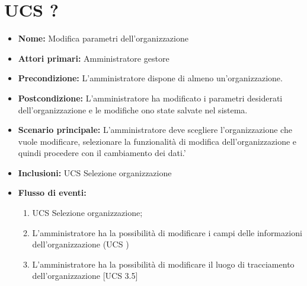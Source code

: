 

\section{UCS ?}%
\begin{itemize}
    \item \textbf{Nome:} Modifica parametri dell'organizzazione\\
    \item \textbf{Attori primari:} Amministratore gestore\\
    \item \textbf{Precondizione:} L’amministratore dispone di almeno un'organizzazione.\\
    \item \textbf{Postcondizione:} L’amministratore ha modificato i parametri desiderati dell'organizzazione e le modifiche ono state salvate nel sistema.\\
    \item \textbf{Scenario principale:} L'amministratore deve scegliere l'organizzazione che vuole modificare, selezionare la funzionalità di modifica dell'organizzazione e quindi procedere con il cambiamento dei dati.'\\
    \item \textbf{Inclusioni:} UCS Selezione organizzazione
    \item \textbf{Flusso di eventi:}
    \begin{enumerate}
        \item UCS Selezione organizzazione;
        \item L'amministratore ha la possibilità di modificare i campi delle informazioni dell’organizzazione (UCS )
        \item L’amministratore ha la possibilità di modificare il luogo di tracciamento dell’organizzazione [UCS 3.5]
    \end{enumerate}
\end{itemize}